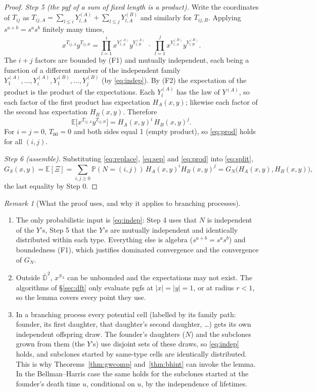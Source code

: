 \documentclass[11pt]{article}
\theoremstyle{definition}
\theoremstyle{remark}
\newtheorem{remark}[theorem]{Remark}
\newcommand{\E}{\mathbb{E}}
\newcommand{\Prob}{\mathbb{P}}
\begin{document}
\begin{proof}
\emph{Step 5 (the pgf of a sum of fixed length is a product).} Write the coordinates of $T_{ij}$ as $T_{ij,A}=\sum_{l\le i}Y^{(A)}_{l,A}+\sum_{l\le j}Y^{(B)}_{l,A}$ and similarly for $T_{ij,B}$. Applying $s^{a+b}=s^as^b$ finitely many times,
\[
x^{T_{ij,A}}y^{T_{ij,B}}=\prod_{l=1}^{i}x^{Y^{(A)}_{l,A}}y^{Y^{(A)}_{l,B}}\;\cdot\;\prod_{l=1}^{j}x^{Y^{(B)}_{l,A}}y^{Y^{(B)}_{l,B}} .
\]
The $i+j$ factors are bounded by (F1) and mutually independent, each being a function of a different member of the independent family $Y^{(A)}_1,\dots,Y^{(A)}_i,Y^{(B)}_1,\dots,Y^{(B)}_j$ (by \eqref{eq:indep}). By (F2) the expectation of the product is the product of the expectations. Each $Y^{(A)}_l$ has the law of $Y^{(A)}$, so each factor of the first product has expectation $H_A(x,y)$; likewise each factor of the second has expectation $H_B(x,y)$. Therefore
\begin{equation}\label{eq:prod}
\E\big[x^{T_{ij,A}}y^{T_{ij,B}}\big]=H_A(x,y)^i\,H_B(x,y)^j .
\end{equation}
For $i=j=0$, $T_{00}=0$ and both sides equal 1 (empty product), so \eqref{eq:prod} holds for all $(i,j)$.

\emph{Step 6 (assemble).} Substituting \eqref{eq:replace}, \eqref{eq:sep} and \eqref{eq:prod} into \eqref{eq:split},
\[
G_S(x,y)=\E[\Xi]=\sum_{i,j\ge0}\Prob(N=(i,j))\,H_A(x,y)^iH_B(x,y)^j=G_N\big(H_A(x,y),H_B(x,y)\big),
\]
the last equality by Step 0.
\end{proof}

\begin{remark}[What the proof uses, and why it applies to branching processes]
\begin{enumerate}
\item The only probabilistic input is \eqref{eq:indep}: Step 4 uses that $N$ is independent of the $Y$'s, Step 5 that the $Y$'s are mutually independent and identically distributed within each type. Everything else is algebra ($s^{a+b}=s^as^b$) and boundedness (F1), which justifies dominated convergence and the convergence of $G_N$.
\item Outside $\bar{\mathbb D}^2$, $x^{S_A}$ can be unbounded and the expectations may not exist. The algorithms of \S\ref{sec:dft} only evaluate pgfs at $|x|=|y|=1$, or at radius $r<1$, so the lemma covers every point they use.
\item In a branching process every potential cell (labelled by its family path: founder, its first daughter, that daughter's second daughter, \dots) gets its own independent offspring draw. The founder's daughters ($N$) and the subclones grown from them (the $Y$'s) use disjoint sets of these draws, so \eqref{eq:indep} holds, and subclones started by same-type cells are identically distributed. This is why Theorems~\ref{thm:gwcomp} and~\ref{thm:bhint} can invoke the lemma. In the Bellman--Harris case the same holds for the subclones started at the founder's death time $u$, conditional on $u$, by the independence of lifetimes.
\end{enumerate}
\end{remark}
\end{document}
